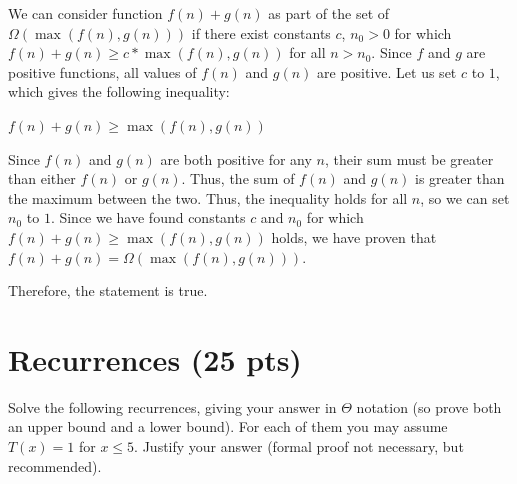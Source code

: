 \documentclass[11pt]{article}
\begin{document}
\begin{enumerate}
We can consider function $f(n)+g(n)$ as part of the set of $\Omega(\max(f(n),g(n)))$ if there exist constants $c$, $n_0 > 0$ for which $f(n)+g(n) \geq c * \max(f(n),g(n))$ for all $n > n_0$. 
Since $f$ and $g$ are positive functions, all values of $f(n)$ and $g(n)$ are positive.
Let us set $c$ to $1$, which gives the following inequality:

$f(n)+g(n) \geq \max(f(n),g(n))$

Since $f(n)$ and $g(n)$ are both positive for any $n$, their sum must be greater than either $f(n)$ or $g(n)$. 
Thus, the sum of $f(n)$ and $g(n)$ is greater than the maximum between the two. 
Thus, the inequality holds for all $n$, so we can set $n_0$ to $1$. 
Since we have found constants $c$ and $n_0$ for which $f(n)+g(n) \geq \max(f(n),g(n))$ holds, we have proven that $f(n)+g(n) = \Omega(\max(f(n),g(n)))$.

Therefore, the statement is true.

\end{enumerate}


\section{Recurrences (25 pts)}

Solve the following recurrences, giving your answer in $\Theta$ notation (so prove both an upper bound and a lower bound).  For each of them you may assume $T(x) = 1$ for $x \leq 5$.   Justify your answer (formal proof not necessary, but recommended).
\end{document}
